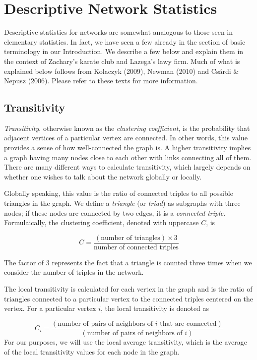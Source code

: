 \documentclass[12pt,twoside]{amherstthesis}
\begin{document}
  \chapter{Descriptive Network
  Statistics}\label{descriptive-network-statistics}
  
  Descriptive statistics for networks are somewhat analogous to those seen
  in elementary statistics. In fact, we have seen a few already in the
  section of basic terminology in our Introduction. We describe a few
  below and explain them in the context of Zachary's karate club and
  Lazega's lawy firm. Much of what is explained below follows from
  Kolaczyk (2009), Newman (2010) and Csárdi \& Nepusz (2006). Please refer
  to these texts for more information.
  
  \section{Transitivity}\label{transitivity}
  
  \emph{Transitivity}, otherwise known as the \emph{clustering
  coefficient}, is the probability that adjacent vertices of a particular
  vertex are connected. In other words, this value provides a sense of how
  well-connected the graph is. A higher transitivity implies a graph
  having many nodes close to each other with links connecting all of them.
  There are many different ways to calculate transitivity, which largely
  depends on whether one wishes to talk about the network globally or
  locally.
  
  Globally speaking, this value is the ratio of connected triples to all
  possible triangles in the graph. We define a \emph{triangle} (or
  \emph{triad}) as subgraphs with three nodes; if these nodes are
  connected by two edges, it is a \emph{connected triple}. Formulaically,
  the clustering coefficient, denoted with uppercase \(C\), is
  
  \[C = \frac {(\text{number of triangles}) \times 3} {\text{number of connected triples}} \]
  
  The factor of \(3\) represents the fact that a triangle is counted three
  times when we consider the number of triples in the network.
  
  The local transitivity is calculated for each vertex in the graph and is
  the ratio of triangles connected to a particular vertex to the connected
  triples centered on the vertex. For a particular vertex \(i\), the local
  transitivity is denoted as
  
  \[ C_{i} = \frac {(\text{number of pairs of neighbors of } i \text{ that are connected})} {(\text{number of pairs of neighbors of } i)} \]
  For our purposes, we will use the local average transitivity, which is
  the average of the local transitivity values for each node in the graph.
  
\end{document}
